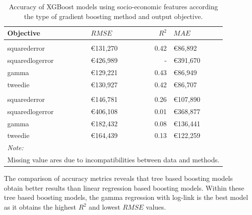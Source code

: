 \documentclass[conference,final,]{IEEEtran}
\begin{document}
\begin{table}[H]

\caption{\label{tab:census-model-comparison}Accuracy of XGBoost models using socio-economic features according the type of gradient boosting method and output objective.}
\centering
\fontsize{8}{10}\selectfont
\begin{tabular}[t]{llrl}
\toprule
Objective & $RMSE$ & $R^2$ & $MAE$\\
\midrule
\addlinespace[0.3em]
\multicolumn{4}{l}{\textbf{Tree based}}\\
\hspace{1em}squarederror & €131,270 & 0.42 & €86,892\\
\hspace{1em}squaredlogerror & €426,989 & - & €391,670\\
\hspace{1em}gamma & €129,221 & 0.43 & €86,949\\
\hspace{1em}tweedie & €130,927 & 0.42 & €86,707\\
\addlinespace[0.3em]
\multicolumn{4}{l}{\textbf{Linear regression based}}\\
\hspace{1em}squarederror & €146,781 & 0.26 & €107,890\\
\hspace{1em}squaredlogerror & €406,108 & 0.01 & €368,877\\
\hspace{1em}gamma & €182,432 & 0.08 & €136,441\\
\hspace{1em}tweedie & €164,439 & 0.13 & €122,259\\
\bottomrule
\multicolumn{4}{l}{\textit{Note: }}\\
\multicolumn{4}{l}{Missing value ares due to incompatibilities between data and methods.}\\
\end{tabular}
\end{table}

The comparison of accuracy metrics reveals that tree based boosting models obtain better results than linear regression based boosting models. Within these tree based boosting models, the gamma regression with log-link is the best model as it obtains the highest \(R^2\) and lowest \(RMSE\) values.
\end{document}
